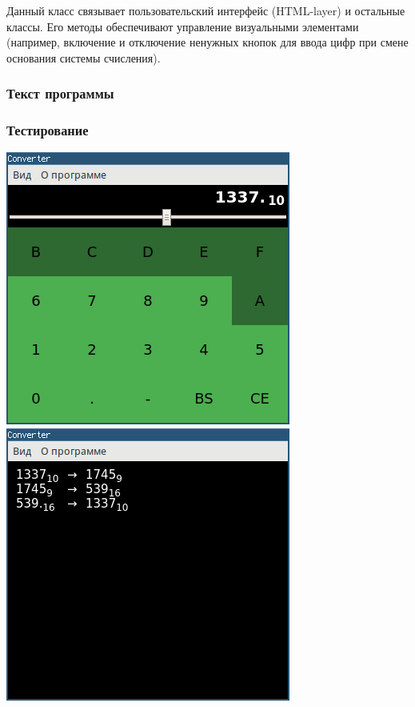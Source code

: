 \documentclass[oneside, final, 10pt]{extarticle}
\begin{document}
Данный класс связывает пользовательский интерфейс (HTML-layer) и остальные классы. Его методы обеспечивают управление визуальными элементами (например, включение и отключение ненужных кнопок для ввода цифр при смене основания системы счисления).

\subsubsection{Текст программы}

\lstset{caption=iface.js}


\subsubsection{Тестирование}
\includegraphics{./screen/test_iface1}
\includegraphics{./screen/test_iface2}
\end{document}
